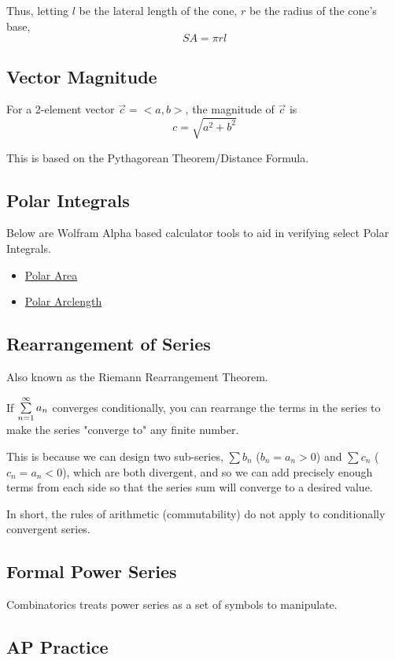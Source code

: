 \documentclass{article}
\begin{document}
Thus, letting $l$ be the lateral length of the cone, $r$ be the radius of the cone's base,
$$SA = \pi rl$$

\subsection{Vector Magnitude}
For a 2-element vector $\Vec{c} = <a,b>$, the magnitude of $\Vec{c}$ is
$$c = \sqrt{a^2 + b^2}$$

This is based on the Pythagorean Theorem/Distance Formula.

\subsection{Polar Integrals}
Below are Wolfram Alpha based calculator tools to aid in verifying select Polar Integrals.

\begin{itemize}
    \item \href{https://www.wolframalpha.com/widgets/view.jsp?id=769788ade06411e063edbd51239787f9}{Polar Area}
    \item \href{https://www.wolframalpha.com/widgets/view.jsp?id=c26cbb9457ff75f58f479364ddb79cd1}{Polar Arclength}
\end{itemize}

\subsection{Rearrangement of Series}
Also known as the Riemann Rearrangement Theorem.

If $\sum_{n=1}^{\infty}\limits a_n$ converges conditionally, you can rearrange the terms in the series to make the series "converge to" any finite number.

This is because we can design two sub-series, $\sum b_n$ ($b_n = a_n > 0$) and $\sum c_n$ ($c_n = a_n < 0$), which are both divergent, and so we can add precisely enough terms from each side so that the series sum will converge to a desired value.

In short, the rules of arithmetic (commutability) do not apply to conditionally convergent series.

\subsection{Formal Power Series}
Combinatorics treats power series as a set of symbols to manipulate.

\subsection{AP Practice}
\end{document}

